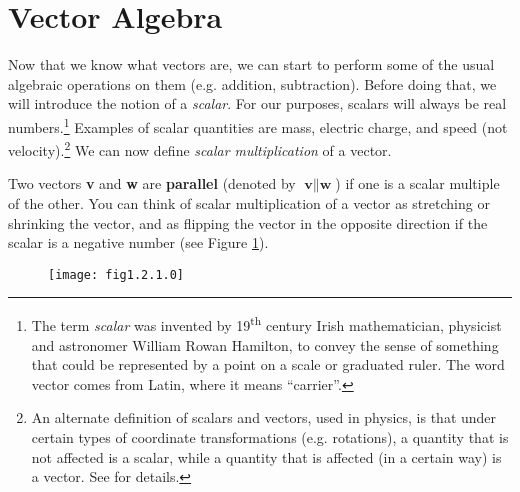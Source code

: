 \section{Vector Algebra}
Now that we know what vectors are, we can start to perform some of the usual algebraic operations on them (e.g.
addition, subtraction). Before doing that, we will introduce the notion of a \emph{scalar}.
For our purposes, scalars will always be real numbers.\footnote{The term \emph{scalar} was invented by
19\textsuperscript{th} century
Irish mathematician, physicist and astronomer William Rowan Hamilton, to convey the sense of something
that could be represented by a point
on a scale or graduated ruler. The word vector comes from Latin, where it means ``carrier''.} Examples of
scalar quantities are mass, electric charge, and speed (not velocity).\footnote{An alternate definition of
scalars and vectors, used in physics, is that under certain types of coordinate transformations (e.g. rotations), a
quantity that is not affected is a scalar, while a quantity that is affected (in a certain way) is a vector.
See \cite{mar} for details.}
We can now define \emph{scalar multiplication} of a vector.


Two vectors \textbf{v} and \textbf{w} are \textbf{parallel} (denoted by $\textbf{v} \parallel
\textbf{w}$) if one is a scalar multiple of the other.
You can think of scalar multiplication of a vector as stretching or shrinking
the vector, and as flipping the vector in the opposite direction if the scalar is a negative number
(see Figure \ref{fig:scalar}).

\begin{figure}[h]
 \begin{center}
  \texttt{[image: fig1.2.1.0]}\vspace{-3mm}
 \end{center}
 \caption[]{}
 \label{fig:scalar}
\end{figure}\vspace{-2mm}

